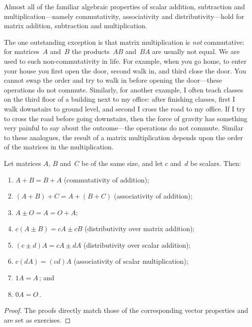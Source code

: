 Almost all of the familiar algebraic properties of scalar addition, subtraction and multiplication---namely commutativity, associativity and distributivity---hold for matrix addition, subtraction and multiplication.

The one outstanding exception is that matrix multiplication is \emph{not} commutative: for matrices~\(A\) and~\(B\) the products~\(AB\) and~\(BA\) are usually not equal.
We are used to such non-commutativity in life.
For example, when you go home, to enter your house you first open the door, second walk in, and third close the door. 
You cannot swap the order and try to walk in before opening the door---these operations do not commute.
Similarly, for another example, I often teach classes on the third floor of a building next to my office: after finishing classes, first I walk downstairs to ground level, and second I cross the road to my office.
If I try to cross the road before going downstairs, then the force of gravity has something very painful to say about the outcome---the operations do not commute.
Similar to these analogues, the result of a matrix multiplication depends upon the order of the matrices in the multiplication.


\begin{theorem} \label{thm:pasm}
Let matrices \(A\), \(B\) and~\(C\) be of the same size, and let \(c\) and~\(d\) be scalars.  Then:
\begin{enumerate}
\item\label{thm:pasma} \(A+B=B+A\) (commutativity of addition);
\item \((A+B)+C=A+(B+C)\) (associativity of addition);
\item \(A\pm O=A=O+A\);
\item \(c(A\pm B)=cA\pm cB\) (distributivity over matrix addition);
\item \((c\pm d)A=cA\pm dA\) (distributivity over scalar addition);
\item \(c(dA)=(cd)A\) (associativity of scalar multiplication);
\item \(1A=A\)\,; and 
\item \(0A=O\)\,.
\end{enumerate}
\end{theorem}

\begin{proof}
The proofs directly match those of the corresponding vector properties and are set as exercises.
\end{proof}



